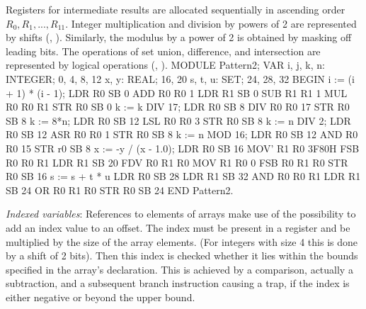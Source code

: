 Registers for intermediate results are allocated sequentially in ascending order $R_0, R_1, ... , R_{11}$. Integer multiplication and division by powers of 2 are represented by shifts (, ). Similarly, the modulus by a power of 2 is obtained by masking off leading bits. The operations of set union, difference, and intersection are represented by logical operations (, ).
\begintt
MODULE Pattern2;
  VAR i, j, k, n: INTEGER;      0, 4, 8, 12
    x, y: REAL;                 16, 20
    s, t, u: SET;               24, 28, 32
BEGIN
  i := (i + 1) * (i - 1);       LDR  R0 SB 0
                                ADD  R0 R0 1
                                LDR  R1 SB 0
                                SUB  R1 R1 1
                                MUL  R0 R0 R1
                                STR  R0 SB 0
  k := k DIV 17;                LDR  R0 SB 8
                                DIV  R0 R0 17
                                STR  R0 SB 8
  k := 8*n;                     LDR  R0 SB 12
                                LSL  R0 R0 3
                                STR  R0 SB 8
  k := n DIV 2;                 LDR  R0 SB 12
                                ASR  R0 R0 1
                                STR  R0 SB 8
  k := n MOD 16;                LDR  R0 SB 12
                                AND  R0 R0 15
                                STR  r0 SB 8
  x := -y / (x - 1.0);          LDR  R0 SB 16
                                MOV' R1 R0 3F80H
                                FSB  R0 R0 R1
                                LDR  R1 SB 20
                                FDV  R0 R1 R0
                                MOV  R1 R0 0
                                FSB  R0 R1 R0
                                STR  R0 SB 16
  s := s + t * u                LDR  R0 SB 28
                                LDR  R1 SB 32
                                AND  R0 R0 R1
                                LDR  R1 SB 24
                                OR   R0 R1 R0
                                STR  R0 SB 24
END Pattern2.
\endtt

\noindent {} \emph{Indexed variables}: References to elements of arrays make use of the possibility to add an index value to an offset. The index must be present in a register and be multiplied by the size of the array elements. (For integers with size 4 this is done by a shift of 2 bits). Then this index is checked whether it lies within the bounds specified in the array's declaration. This is achieved by a comparison, actually a subtraction, and a subsequent branch instruction causing a trap, if the index is either negative or beyond the upper bound.

